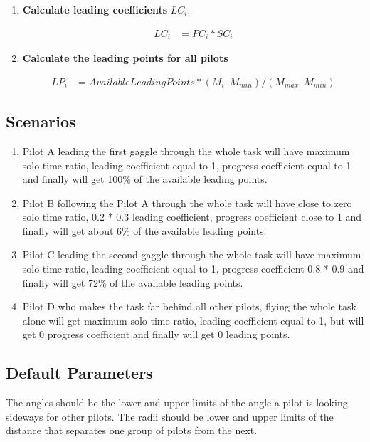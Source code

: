 \documentclass[gap.tex]{subfiles}
\begin{document}
\begin{enumerate}
    \item \textbf{Calculate leading coefficients} \(LC_i\).
        
        \begin{align*}
            LC_i &= PC_i * SC_i
        \end{align*}
            
    \item \textbf{Calculate the leading points for all pilots}
        
        \begin{align*}
            LP_i &= AvailableLeadingPoints * (M_i – M_{min}) / (M_{max} – M_{min} )
        \end{align*}
\end{enumerate}

\subsection{Scenarios}

\begin{enumerate}
    \item Pilot A leading the first gaggle through the whole task will have
        maximum solo time ratio, leading coefficient equal to 1, progress
        coefficient equal to 1 and finally will get 100\% of the available
        leading points.

    \item Pilot B following the Pilot A through the whole task will have close
        to zero solo time ratio, 0.2 * 0.3 leading coefficient, progress
        coefficient close to 1 and finally will get about 6\% of the available
        leading points.

    \item Pilot C leading the second gaggle through the whole task will have
        maximum solo time ratio, leading coefficient equal to 1, progress
        coefficient 0.8 * 0.9 and finally will get 72\% of the available
        leading points.

    \item Pilot D who makes the task far behind all other pilots, flying the
        whole task alone will get maximum solo time ratio, leading coefficient
        equal to 1, but will get 0 progress coefficient and finally will get
        0 leading points.
\end{enumerate}

\subsection{Default Parameters}
The angles should be the lower and upper limits of the angle a pilot is looking
sideways for other pilots.  The radii should be lower and upper limits of the
distance that separates one group of pilots from the next.
\end{document}
